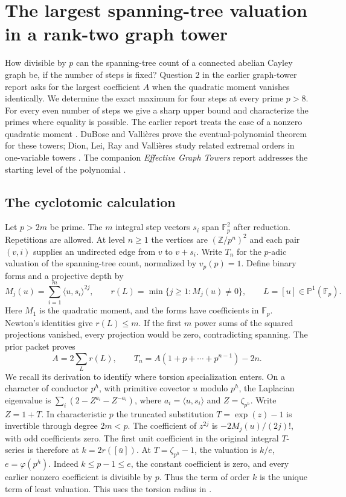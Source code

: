 \section{The largest spanning-tree valuation in a rank-two graph tower}
\label{sec:graph-extreme}

How divisible by $p$ can the spanning-tree count of a connected abelian Cayley graph be, if the number of steps is fixed? Question 2 in the earlier graph-tower report asks for the largest coefficient $A$ when the quadratic moment vanishes identically. We determine the exact maximum for four steps at every prime $p>8$. For every even number of steps we give a sharp upper bound and characterize the primes where equality is possible. The earlier report treats the case of a nonzero quadratic moment \cite{oldgraphs}. DuBose and Valli\`eres prove the eventual-polynomial theorem for these towers; Dion, Lei, Ray and Valli\`eres study related extremal orders in one-variable towers \cite{dv,dlrv}. The companion \emph{Effective Graph Towers} report addresses the starting level of the polynomial \cite{effective}.

\subsection{The cyclotomic calculation}
Let $p>2m$ be prime. The $m$ integral step vectors $s_i$ span $\mathbb F_p^2$ after reduction. Repetitions are allowed. At level $n\ge1$ the vertices are $(\mathbb Z/p^n)^2$ and each pair $(v,i)$ supplies an undirected edge from $v$ to $v+s_i$. Write $T_n$ for the $p$-adic valuation of the spanning-tree count, normalized by $v_p(p)=1$. Define binary forms and a projective depth by
\[
 M_j(u)=\sum_{i=1}^m\langle u,s_i\rangle^{2j},
 \qquad r(L)=\min\{j\ge1: M_j(u)\ne0\},\qquad L=[u]\in\mathbb P^1(\mathbb F_p).
\]
Here $M_1$ is the quadratic moment, and the forms have coefficients in $\mathbb F_p$. Newton's identities give $r(L)\le m$. If the first $m$ power sums of the squared projections vanished, every projection would be zero, contradicting spanning. The prior packet proves
\begin{equation}
 A=2\sum_L r(L),\qquad T_n=A(1+p+\cdots+p^{n-1})-2n.       \label{eq:graph-coeff}
\end{equation}
We recall its derivation to identify where torsion specialization enters. On a character of conductor $p^h$, with primitive covector $u$ modulo $p^h$, the Laplacian eigenvalue is $\sum_i(2-Z^{a_i}-Z^{-a_i})$, where $a_i=\langle u,s_i\rangle$ and $Z=\zeta_{p^h}$. Write $Z=1+T$. In characteristic $p$ the truncated substitution $T=\exp(z)-1$ is invertible through degree $2m<p$. The coefficient of $z^{2j}$ is $-2M_j(u)/(2j)!$, with odd coefficients zero. The first unit coefficient in the original integral $T$-series is therefore at $k=2r([\bar u])$. At $T=\zeta_{p^h}-1$, the valuation is $k/e$, $e=\varphi(p^h)$. Indeed $k\le p-1\le e$, the constant coefficient is zero, and every earlier nonzero coefficient is divisible by $p$. Thus the term of order $k$ is the unique term of least valuation. This uses the torsion radius in .

